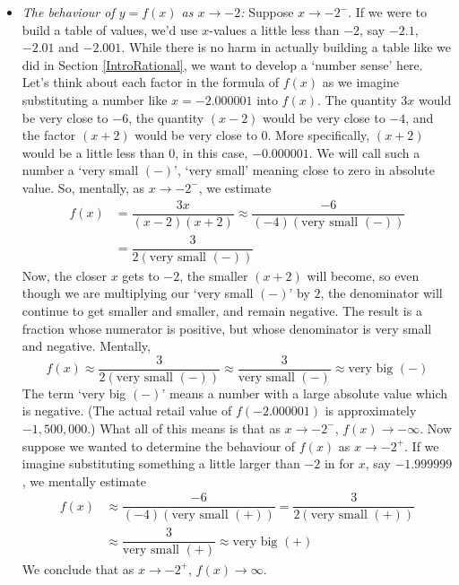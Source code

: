 {\begin{enumerate}
\drawexampleline

\begin{itemize}

\item  \textit{The behaviour of $y=f(x)$ as $x \rightarrow -2$:}  Suppose $x \rightarrow -2^{-}$.  If we were to build a table of values, we'd use $x$-values a little less than $-2$, say $-2.1$, $-2.01$ and $-2.001$.  While there is no harm in actually building a table like we did in Section \ref{IntroRational}, we want to develop a `number sense' here.  Let's think about each factor in the formula of $f(x)$ as we imagine substituting a number like $x=-2.000001$ into $f(x)$. The quantity $3x$ would be very close to $-6$, the quantity $(x-2)$ would be very close to $-4$, and the factor $(x+2)$ would be very close to $0$.  More specifically, $(x+2)$ would be a little less than $0$, in this case, $-0.000001.$  We will call such a number a `very small $(-)$', `very small' meaning close to zero in absolute value. So, mentally, as $x \rightarrow -2^{-}$, we estimate  
\begin{align*}
 f(x)  & = \dfrac{3x}{(x-2)(x+2)} \approx \dfrac{-6}{(-4)\left( \mbox{very small $(-)$}\right)}\\
 & = \dfrac{3}{2 \left( \mbox{very small $(-)$}\right)}
 \end{align*}
Now, the closer $x$ gets to $-2$, the smaller $(x+2)$ will become, so even though we are multiplying our `very small $(-)$' by $2$, the denominator will continue to get smaller and smaller, and remain negative.  The result is a fraction whose numerator is positive, but whose denominator is very small and negative.  Mentally, \[f(x) \approx \dfrac{3}{2 \left( \mbox{very small $(-)$}\right)} \approx \dfrac{3}{\mbox{very small $(-)$}} \approx \mbox{very big $(-)$}\]  The term `very big $(-)$' means a number with a large absolute value which is negative. (The actual retail value of $f(-2.000001)$ is approximately $-1,\!500,\!000$.)  What all of this means is that as $x \rightarrow -2^{-}$, $f(x) \rightarrow -\infty$.  Now suppose we wanted to determine the behaviour of $f(x)$ as $x \rightarrow -2^{+}$.  If we imagine substituting something a little larger than $-2$ in for $x$, say $-1.999999$, we mentally estimate 
\begin{align*}
f(x) & \approx \dfrac{-6}{(-4)\left( \mbox{very small $(+)$}\right)} = \dfrac{3}{2 \left( \mbox{very small $(+)$}\right)}\\
&  \approx \dfrac{3}{\mbox{very small $(+)$}} \approx \mbox{very big $(+)$}
\end{align*}
We conclude that as $x \rightarrow -2^{+}$, $f(x) \rightarrow \infty$.


\end{itemize}
\end{enumerate}}
